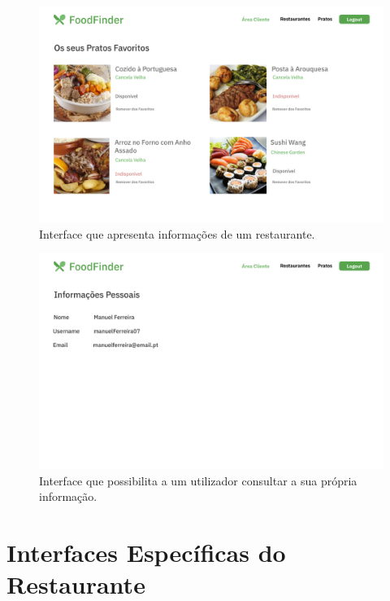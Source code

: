 \documentclass[a4paper,12pt]{report}
\begin{document}
	\begin{figure}[H]
	\begin{center}
	\includegraphics[scale=0.25]{15.1-Screen15}	
	\end{center}
	\caption{Interface que apresenta informações de um restaurante.}
	\end{figure} 
	
	\begin{figure}[H]
	\begin{center}
	\includegraphics[scale=0.25]{16.1-Screen16}	
	\end{center}
	\caption{Interface que possibilita a um utilizador consultar a sua própria informação.}
	\end{figure}  

	
	
	
	
	
	
\section{Interfaces Específicas do Restaurante}	
\end{document}
